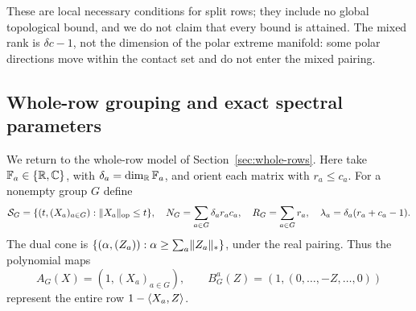 These are local necessary conditions for split rows; they include no
global topological bound, and we do not claim that every bound is
attained.  The mixed rank is $\delta c-1$, not
the dimension of the polar extreme manifold: some polar directions move
within the contact set and do not enter the mixed pairing.

\subsection{Whole-row grouping and exact spectral parameters}

We return to the whole-row model of Section~\ref{sec:whole-rows}.
Here take $\mathbb F_a\in\{\mathbb R,\mathbb C\}$, with
$\delta_a=\dim_{\mathbb R}\mathbb F_a$, and orient each matrix with $r_a\leq c_a$.
For a nonempty group $G$ define
\[
 \mathcal S_G=\{(t,(X_a)_{a\in G}):\lVert X_a\rVert_{\rm op}\leq t\},
 \quad N_G=\sum_{a\in G}\delta_a r_ac_a,
 \quad R_G=\sum_{a\in G}r_a,
 \quad \lambda_a=\delta_a(r_a+c_a-1).
\]
The dual cone is
$\{(\alpha,(Z_a)):\alpha\geq\sum_a\lVert Z_a\rVert_*\}$, under the real
pairing.  Thus the polynomial maps
\[
 A_G(X)=(1,(X_a)_{a\in G}),\qquad
 B_G^a(Z)=(1,(0,\ldots,-Z,\ldots,0))
\]
represent the entire row $1-\langle X_a,Z\rangle$.

